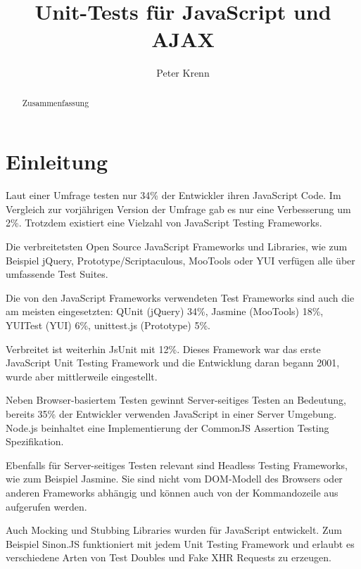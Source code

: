 \documentclass[11pt, a4paper]{article}
\title{Unit-Tests für JavaScript und AJAX}
\author{Peter Krenn}
\begin{document}
\maketitle

\begin{abstract}
Zusammenfassung
\end{abstract}

\tableofcontents

\section{Einleitung}

Laut einer Umfrage\cite{young_dailyjs_2010} testen nur 34\% der Entwickler ihren
JavaScript Code. Im Vergleich zur vorjährigen Version der
Umfrage\cite{young_dailyjs_2009} gab es nur eine Verbesserung um 2\%. Trotzdem
existiert eine Vielzahl von JavaScript Testing Frameworks.

Die verbreitetsten Open Source JavaScript Frameworks und Libraries, wie zum
Beispiel jQuery\cite{resig_jquery_2011},
Prototype/Scriptaculous\cite{prototype_js_prototype_2011},
MooTools\cite{mootools_mootools_2011} oder YUI\cite{yahoo_inc._yui_2011-1}
verfügen alle über umfassende Test Suites.

Die von den JavaScript Frameworks verwendeten Test Frameworks sind auch die
am meisten eingesetzten: QUnit\cite{zaefferer_qunit_2011} (jQuery) 34\%,
Jasmine\cite{jasmine_jasmine_2011} (MooTools) 18\%,
YUITest\cite{yahoo_inc._yui_2011} (YUI) 6\%,
unittest.js\cite{fuchs_unittest.js_2011} (Prototype) 5\%.

Verbreitet ist weiterhin JsUnit\cite{jsunit_jsunit_2011} mit 12\%. Dieses
Framework war das erste JavaScript Unit Testing Framework und die Entwicklung
daran begann 2001, wurde aber mittlerweile eingestellt.

Neben Browser-basiertem Testen gewinnt Server-seitiges Testen an Bedeutung,
bereits 35\% der Entwickler verwenden JavaScript in einer Server Umgebung.
Node.js beinhaltet eine Implementierung der CommonJS Assertion Testing
Spezifikation\cite{node.js_node.js_2011}.

Ebenfalls für Server-seitiges Testen relevant sind Headless Testing Frameworks,
wie zum Beispiel Jasmine. Sie sind nicht vom DOM-Modell des Browsers oder
anderen Frameworks abhängig und können auch von der Kommandozeile aus aufgerufen
werden.

Auch Mocking und Stubbing Libraries wurden für JavaScript entwickelt.
Zum Beispiel Sinon.JS\cite{johansen_sinon.js_2011} funktioniert mit jedem Unit
Testing Framework und erlaubt es verschiedene Arten von Test Doubles und Fake
XHR Requests zu erzeugen.
\end{document}
